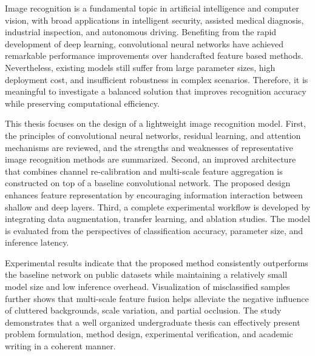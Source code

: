 Image recognition is a fundamental topic in artificial intelligence and computer vision, with broad applications in intelligent security, assisted medical diagnosis, industrial inspection, and autonomous driving. Benefiting from the rapid development of deep learning, convolutional neural networks have achieved remarkable performance improvements over handcrafted feature based methods. Nevertheless, existing models still suffer from large parameter sizes, high deployment cost, and insufficient robustness in complex scenarios. Therefore, it is meaningful to investigate a balanced solution that improves recognition accuracy while preserving computational efficiency.

This thesis focuses on the design of a lightweight image recognition model. First, the principles of convolutional neural networks, residual learning, and attention mechanisms are reviewed, and the strengths and weaknesses of representative image recognition methods are summarized. Second, an improved architecture that combines channel re-calibration and multi-scale feature aggregation is constructed on top of a baseline convolutional network. The proposed design enhances feature representation by encouraging information interaction between shallow and deep layers. Third, a complete experimental workflow is developed by integrating data augmentation, transfer learning, and ablation studies. The model is evaluated from the perspectives of classification accuracy, parameter size, and inference latency.

Experimental results indicate that the proposed method consistently outperforms the baseline network on public datasets while maintaining a relatively small model size and low inference overhead. Visualization of misclassified samples further shows that multi-scale feature fusion helps alleviate the negative influence of cluttered backgrounds, scale variation, and partial occlusion. The study demonstrates that a well organized undergraduate thesis can effectively present problem formulation, method design, experimental verification, and academic writing in a coherent manner.

